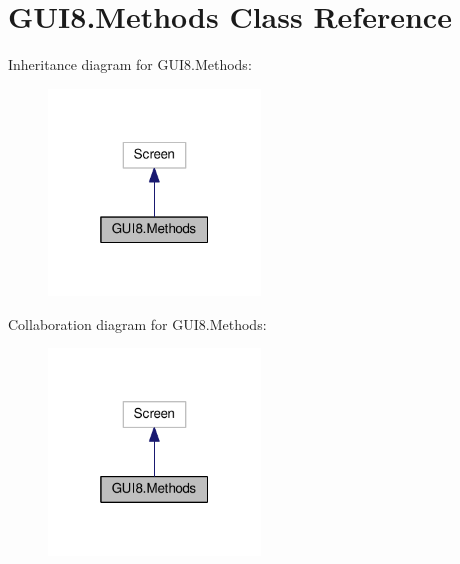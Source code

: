 \hypertarget{classGUI8_1_1Methods}{}\section{G\+U\+I8.\+Methods Class Reference}
\label{classGUI8_1_1Methods}


Inheritance diagram for G\+U\+I8.\+Methods\+:
\nopagebreak
\begin{figure}[H]
\begin{center}
\leavevmode
\includegraphics[width=160pt]{classGUI8_1_1Methods__inherit__graph}
\end{center}
\end{figure}


Collaboration diagram for G\+U\+I8.\+Methods\+:
\nopagebreak
\begin{figure}[H]
\begin{center}
\leavevmode
\includegraphics[width=160pt]{classGUI8_1_1Methods__coll__graph}
\end{center}
\end{figure}
